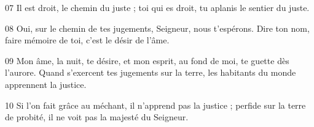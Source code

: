 
07 Il est droit, le chemin du juste ; toi qui es droit, tu aplanis le sentier du juste.

08 Oui, sur le chemin de tes jugements, Seigneur, nous t’espérons. Dire ton nom, faire mémoire de toi, c’est le désir de l’âme.

09 Mon âme, la nuit, te désire, et mon esprit, au fond de moi, te guette dès l’aurore. Quand s’exercent tes jugements sur la terre, les habitants du monde apprennent la justice.

10 Si l’on fait grâce au méchant, il n’apprend pas la justice ; perfide sur la terre de probité, il ne voit pas la majesté du Seigneur.
